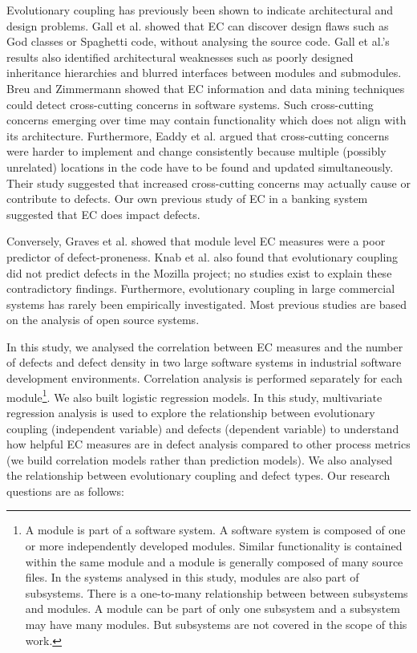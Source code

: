 \documentclass[times]{smrauth}
\begin{document}
Evolutionary coupling has previously been shown to indicate architectural and design problems. Gall et al. \cite{gall1998detection} \cite{gall2003cvs} showed that EC can discover design flaws such as God classes or Spaghetti code, without analysing the source code. Gall et al.'s results also identified architectural weaknesses such as poorly designed inheritance hierarchies and blurred interfaces between modules and submodules. Breu and Zimmermann \cite{breu2006mining} showed that EC information and data mining techniques could detect cross-cutting concerns in software systems. Such cross-cutting concerns emerging over time may contain functionality which does not align with its architecture. Furthermore, Eaddy et al. \cite{eaddy2008crosscutting} argued that cross-cutting concerns were harder to implement and change consistently because multiple (possibly unrelated) locations in the code have to be found and updated simultaneously. Their study suggested that increased cross-cutting concerns may actually cause or contribute to defects. Our own previous study of EC in a banking system \cite{Kirbas:2014:EEC:2652524.2652577} suggested that EC does impact defects.


Conversely, Graves et al. \cite{graves2000predicting} showed that module level EC measures were a poor predictor of defect-proneness. Knab et al. \cite{knab2006predicting} also found that evolutionary coupling did not predict defects in the Mozilla project; no studies exist to explain these contradictory findings. Furthermore, evolutionary coupling in large commercial systems has rarely been empirically investigated. Most previous studies are based on the analysis of open source systems.

In this study, we analysed the correlation between EC measures and the number of defects and defect density in two large software systems in industrial software development environments. Correlation analysis is performed separately for each module\footnote{A module is part of a software system. A software system is composed of one or more independently developed modules. Similar functionality is contained within the same module and a module is generally composed of many source files. In the systems analysed in this study, modules are also part of subsystems. There is a one-to-many relationship between between subsystems and modules. A module can be part of only one subsystem and a subsystem may have many modules. But subsystems are not covered in the scope of this work.}. We also built logistic regression models. In this study, multivariate regression analysis is used to explore the relationship between evolutionary coupling (independent variable) and defects (dependent variable) to understand how helpful EC measures are in defect analysis compared to other process metrics (we build correlation models rather than prediction models). We also analysed the relationship between evolutionary coupling and defect types. Our research questions are as follows:
\end{document}
